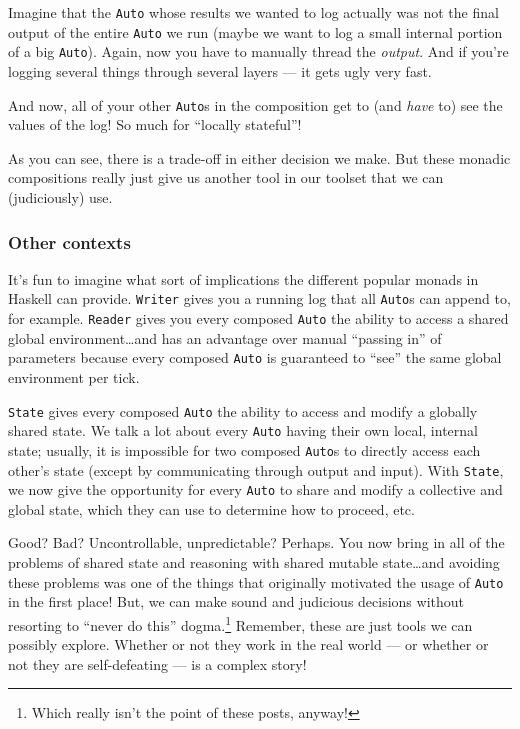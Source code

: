 \documentclass[]{article}
\begin{document}
Imagine that the \texttt{Auto} whose results we wanted to log actually was not
the final output of the entire \texttt{Auto} we run (maybe we want to log a
small internal portion of a big \texttt{Auto}). Again, now you have to manually
thread the \emph{output}. And if you're logging several things through several
layers --- it gets ugly very fast.

And now, all of your other \texttt{Auto}s in the composition get to (and
\emph{have} to) see the values of the log! So much for ``locally stateful''!

As you can see, there is a trade-off in either decision we make. But these
monadic compositions really just give us another tool in our toolset that we can
(judiciously) use.

\subsubsection{Other contexts}\label{other-contexts}

It's fun to imagine what sort of implications the different popular monads in
Haskell can provide. \texttt{Writer} gives you a running log that all
\texttt{Auto}s can append to, for example. \texttt{Reader} gives you every
composed \texttt{Auto} the ability to access a shared global
environment\ldots and has an advantage over manual ``passing in'' of parameters
because every composed \texttt{Auto} is guaranteed to ``see'' the same global
environment per tick.

\texttt{State} gives every composed \texttt{Auto} the ability to access and
modify a globally shared state. We talk a lot about every \texttt{Auto} having
their own local, internal state; usually, it is impossible for two composed
\texttt{Auto}s to directly access each other's state (except by communicating
through output and input). With \texttt{State}, we now give the opportunity for
every \texttt{Auto} to share and modify a collective and global state, which
they can use to determine how to proceed, etc.

Good? Bad? Uncontrollable, unpredictable? Perhaps. You now bring in all of the
problems of shared state and reasoning with shared mutable state\ldots and
avoiding these problems was one of the things that originally motivated the
usage of \texttt{Auto} in the first place! But, we can make sound and judicious
decisions without resorting to ``never do this'' dogma.\footnote{Which really
  isn't the point of these posts, anyway!} Remember, these are just tools we can
possibly explore. Whether or not they work in the real world --- or whether or
not they are self-defeating --- is a complex story!
\end{document}
